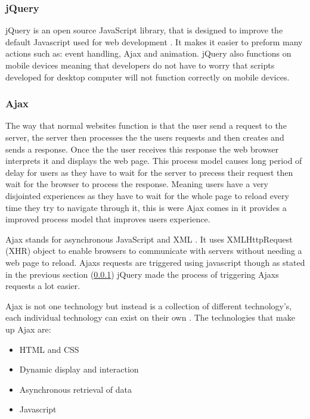\documentclass[12pt]{article}  %
\begin{document}
\subsubsection{jQuery} \label{sec:jquery}
jQuery is an open source JavaScript library, that is designed to improve the default Javascript used for web development \cite{jquery.org_jquery_nodate}. It makes it easier to preform many actions such as: event handling, Ajax and animation. jQuery also functions on mobile devices meaning that developers do not have to worry that scripts developed for desktop computer will not function correctly on mobile devices.  

\subsubsection{Ajax}
The way that normal websites function is that the user send a request to the server, the server then processes the the users requests and then creates and sends a response. Once the the user receives this response the web browser interprets it and displays the web page\cite{smith_simplifying_2006}. This process model causes long period of delay for users as they have to wait for the server to precess their request then wait for the browser to process the response. Meaning users have a very disjointed experiences as they have to wait for the whole page to reload every time they try to navigate through it, this is were Ajax comes in it provides a improved process model that improves users experience.  

 Ajax stands for asynchronous JavaScript and XML \cite{jquery.org_ajax_nodate}. It uses XMLHttpRequest (XHR) object to enable browsers to communicate with servers without needing a web page to reload. Ajaxs requests are triggered using javascript though as stated in the previous section (\ref{sec:jquery}) jQuery made the process of triggering Ajaxs requests a lot easier.  
 
 
 Ajax is not one technology but instead is a collection of different technology's, each individual technology can exist on their own \cite{garrett_ajax:_2005}. The technologies that make up Ajax are:
 
 \begin{itemize}
 \item HTML and CSS
 \item Dynamic display and interaction
 \item Asynchronous retrieval of data
 \item Javascript
 \end{itemize}
\end{document}
